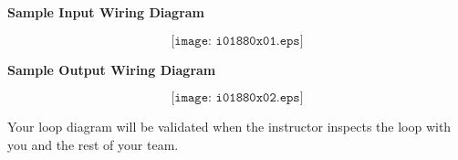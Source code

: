 \vfil \eject

\noindent
{\bf Sample Input Wiring Diagram}

$$\texttt{[image: i01880x01.eps]}$$


\vfil \eject

\noindent
{\bf Sample Output Wiring Diagram}

$$\texttt{[image: i01880x02.eps]}$$








Your loop diagram will be validated when the instructor inspects the loop with you and the rest of your team.











